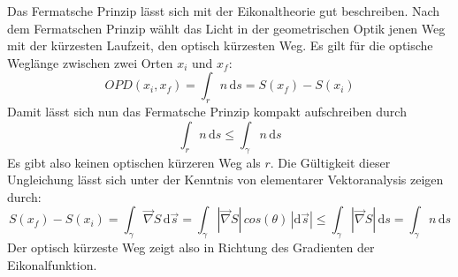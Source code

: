 \documentclass[twoside,colorback,accentcolor=tud4c,11pt]{tudreport}
\begin{document}
		Das Fermatsche Prinzip lässt sich mit der Eikonaltheorie gut beschreiben. Nach dem Fermatschen Prinzip wählt das Licht in der geometrischen Optik jenen Weg mit der kürzesten Laufzeit, den optisch kürzesten Weg. Es gilt für die optische Weglänge zwischen zwei Orten $x_i$ und $x_f$:
		\[ 
		OPD\left(x_i,x_f\right) = \int_r n \,\mathrm{d}s = S\left(x_f\right) - S\left(x_i\right)
		\]
		Damit lässt sich nun das Fermatsche Prinzip kompakt aufschreiben durch
		\[
		\int_r n \,\mathrm{d}s \le \int_\gamma n \,\mathrm{d}s 
		\]
		Es gibt also keinen optischen kürzeren Weg als $r$. 
		Die Gültigkeit dieser Ungleichung lässt sich unter der Kenntnis von elementarer Vektoranalysis zeigen durch:
		\[
		S\left(x_f\right) - S\left(x_i\right) = 
		\int_\gamma \vec{\nabla} S \, \mathrm{d}\vec{s} =
		\int_\gamma |\vec{\nabla} S|\,cos\left(\theta \right)\,|\mathrm{d}\vec{s}| \le \int_\gamma |\vec{\nabla} S|\,\mathrm{d}s = \int_\gamma n \, \mathrm{d}s
		\]
		Der optisch kürzeste Weg zeigt also in Richtung des Gradienten der Eikonalfunktion.
\end{document}
